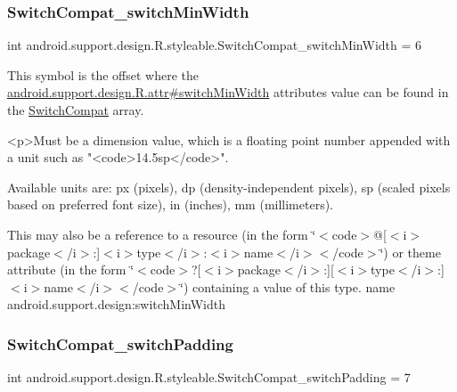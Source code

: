 \subsubsection{\texorpdfstring{Switch\+Compat\+\_\+switch\+Min\+Width}{SwitchCompat\_switchMinWidth}}
{\footnotesize\ttfamily int android.\+support.\+design.\+R.\+styleable.\+Switch\+Compat\+\_\+switch\+Min\+Width = 6\hspace{0.3cm}{\ttfamily [static]}}

This symbol is the offset where the \hyperlink{classandroid_1_1support_1_1design_1_1R_1_1attr_a91b9eeca090178e16f54c7a9103bb7b9}{android.\+support.\+design.\+R.\+attr\#switch\+Min\+Width} attribute\textquotesingle{}s value can be found in the \hyperlink{classandroid_1_1support_1_1design_1_1R_1_1styleable_a7389a923bf3e321b6b5d10b0589547a1}{Switch\+Compat} array.

\begin{DoxyVerb}      <p>Must be a dimension value, which is a floating point number appended with a unit such as "<code>14.5sp</code>".
\end{DoxyVerb}
 Available units are\+: px (pixels), dp (density-\/independent pixels), sp (scaled pixels based on preferred font size), in (inches), mm (millimeters). 

This may also be a reference to a resource (in the form \char`\"{}$<$code$>$@\mbox{[}$<$i$>$package$<$/i$>$\+:\mbox{]}$<$i$>$type$<$/i$>$\+:$<$i$>$name$<$/i$>$$<$/code$>$\char`\"{}) or theme attribute (in the form \char`\"{}$<$code$>$?\mbox{[}$<$i$>$package$<$/i$>$\+:\mbox{]}\mbox{[}$<$i$>$type$<$/i$>$\+:\mbox{]}$<$i$>$name$<$/i$>$$<$/code$>$\char`\"{}) containing a value of this type.  name android.\+support.\+design\+:switch\+Min\+Width \mbox{\label{classandroid_1_1support_1_1design_1_1R_1_1styleable_aa2d2bf8e29bf1a8f4af8c7cdbd15941c}} 
\subsubsection{\texorpdfstring{Switch\+Compat\+\_\+switch\+Padding}{SwitchCompat\_switchPadding}}
{\footnotesize\ttfamily int android.\+support.\+design.\+R.\+styleable.\+Switch\+Compat\+\_\+switch\+Padding = 7\hspace{0.3cm}{\ttfamily [static]}}

